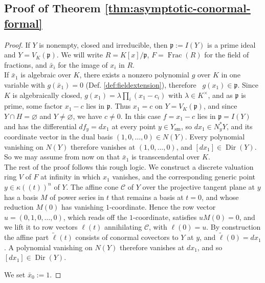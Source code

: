 \documentclass[pdflatex,sn-mathphys-num]{sn-jnl}
\numberwithin{equation}{section}
\theoremstyle{thmstyleone}
\theoremstyle{thmstyletwo}
\begin{document}
\subsection{Proof of Theorem \ref{thm:asymptotic-conormal-formal}}\label{sub:asym}
\begin{proof}

If $Y$ is nonempty, closed and irreducible, then $\mathfrak p:=I(Y)$ is a prime
ideal and $Y=V_K(\mathfrak p)$. We will write $R=K[x]/\mathfrak p$, $F=\operatorname{Frac}(R)$ for the field of fractions, and $\bar x_i$ for the image of $x_i$ in $R$. \\

If $\bar x_1$ is algebraic over $K$, there exists a nonzero polynomial $g$ over $K$
in one variable with $g(\bar x_1)=0$ (Def. \ref{def:fieldextension}), therefore \ $g(x_1)\in\mathfrak p$. Since $K$
is algebraically closed, $g(x_1)=\lambda\prod_i(x_1-c_i)$ with
$\lambda\in K^\times$, and as $\mathfrak p$ is prime, some factor $x_1-c$ lies
in $\mathfrak p$. Thus $x_1=c$ on $Y=V_K(\mathfrak p)$, and since $Y\cap H = \varnothing$ and $Y\neq\varnothing$, we have $c\neq0$.
In this case $f=x_1-c$ lies in $\mathfrak p=I(Y)$ and has the differential
$df_y=dx_1$ at every point $y\in Y_{\mathrm{sm}}$, so $dx_1\in N_y^*Y$, and its coordinate vector in the dual basis $(1,0,\dots , 0) \in N(Y)$. Every polynomial vanishing on $N(Y)$ therefore vanishes at $(1,0,\dots , 0)$, and
$[dx_1]\in\operatorname{Dir}(Y)$. So we may assume from now on that
$\bar x_1$ is transcendental over $K$.\\

The rest of the proof follows this rough logic. We construct a discrete valuation
ring $V$ of $F$ at infinity in which $x_1$ vanishes, and the corresponding
generic point $y\in\kappa((t))^n$ of $Y$. The affine cone $\mathcal C$ of $Y$ over the projective tangent plane at
$y$ has a basis $M$ of power series in $t$ that remains a basis at $t=0$, and
whose reduction $M(0)$ has vanishing $1$-coordinate. Hence the row vector
$u=(0,1,0,\dots,0)$, which reads off the $1$-coordinate, satisfies
$uM(0)=0$, and we lift it to row vectors $\ell(t)$ annihilating $\mathcal C$,
with $\ell(0)=u$. By construction the affine part $\tilde\ell(t)$ consists of
conormal covectors to $Y$ at $y$, and $\tilde\ell(0)=dx_1$. A polynomial
vanishing on $N(Y)$ therefore vanishes at $dx_1$, and so $[dx_1]\in\operatorname{Dir}(Y)$.

We set $\bar x_0:=1$.


\end{proof}
\end{document}
